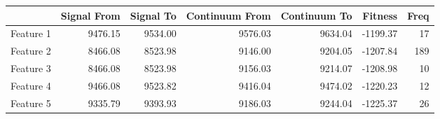 \begin{table}
\begin{center}
\begin{tabular}{rrrrrrr}
  \hline
 & Signal From & Signal To & Continuum From & Continuum To & Fitness & Freq \\ 
  \hline
Feature 1 & 9476.15 & 9534.00 & 9576.03 & 9634.04 & -1199.37 &  17 \\ 
  Feature 2 & 8466.08 & 8523.98 & 9146.00 & 9204.05 & -1207.84 & 189 \\ 
  Feature 3 & 8466.08 & 8523.98 & 9156.03 & 9214.07 & -1208.98 &  10 \\ 
  Feature 4 & 9466.08 & 9523.82 & 9416.04 & 9474.02 & -1220.23 &  12 \\ 
  Feature 5 & 9335.79 & 9393.93 & 9186.03 & 9244.04 & -1225.37 &  26 \\ 

\end{tabular}
\end{center}
\end{table}
